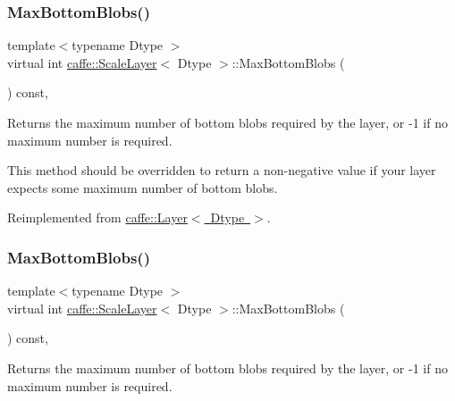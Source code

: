 \subsubsection{\texorpdfstring{Max\+Bottom\+Blobs()}{MaxBottomBlobs()}\hspace{0.1cm}{\footnotesize\ttfamily [1/2]}}
{\footnotesize\ttfamily template$<$typename Dtype $>$ \\
virtual int \mbox{\hyperlink{classcaffe_1_1_scale_layer}{caffe\+::\+Scale\+Layer}}$<$ Dtype $>$\+::Max\+Bottom\+Blobs (\begin{DoxyParamCaption}{ }\end{DoxyParamCaption}) const\hspace{0.3cm}{\ttfamily [inline]}, {\ttfamily [virtual]}}



Returns the maximum number of bottom blobs required by the layer, or -\/1 if no maximum number is required. 

This method should be overridden to return a non-\/negative value if your layer expects some maximum number of bottom blobs. 

Reimplemented from \mbox{\hyperlink{classcaffe_1_1_layer_af8bdc989053e0363ab032026b46de7c3}{caffe\+::\+Layer$<$ Dtype $>$}}.

\mbox{\label{classcaffe_1_1_scale_layer_a7867d035776f78fe486ce633ec0520ad}} 
\subsubsection{\texorpdfstring{Max\+Bottom\+Blobs()}{MaxBottomBlobs()}\hspace{0.1cm}{\footnotesize\ttfamily [2/2]}}
{\footnotesize\ttfamily template$<$typename Dtype $>$ \\
virtual int \mbox{\hyperlink{classcaffe_1_1_scale_layer}{caffe\+::\+Scale\+Layer}}$<$ Dtype $>$\+::Max\+Bottom\+Blobs (\begin{DoxyParamCaption}{ }\end{DoxyParamCaption}) const\hspace{0.3cm}{\ttfamily [inline]}, {\ttfamily [virtual]}}



Returns the maximum number of bottom blobs required by the layer, or -\/1 if no maximum number is required. 

